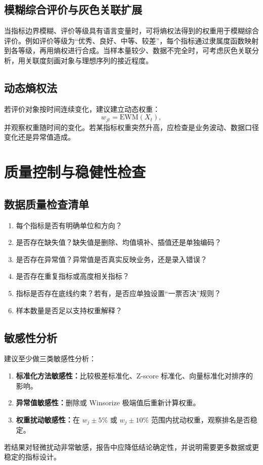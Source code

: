 \documentclass[UTF8,zihao=-4]{ctexart}
\begin{document}
\subsection{模糊综合评价与灰色关联扩展}
当指标边界模糊、评价等级具有语言变量时，可将熵权法得到的权重用于模糊综合评价。例如评价等级为“优秀、良好、中等、较差”，每个指标通过隶属度函数映射到各等级，再用熵权进行合成。当样本量较少、数据不完全时，可考虑灰色关联分析，用关联度刻画对象与理想序列的接近程度。

\subsection{动态熵权法}
若评价对象按时间连续变化，建议建立动态权重：
\begin{equation}
w_{jt}=\text{EWM}(X_t),
\end{equation}
并观察权重随时间的变化。若某指标权重突然升高，应检查是业务波动、数据口径变化还是异常值造成。

\section{质量控制与稳健性检查}

\subsection{数据质量检查清单}
\begin{enumerate}
  \item 每个指标是否有明确单位和方向？
  \item 是否存在缺失值？缺失值是删除、均值填补、插值还是单独编码？
  \item 是否存在异常值？异常值是否真实反映业务，还是录入错误？
  \item 是否存在重复指标或高度相关指标？
  \item 指标是否存在底线约束？若有，是否应单独设置“一票否决”规则？
  \item 样本数量是否足以支持权重解释？
\end{enumerate}

\subsection{敏感性分析}
建议至少做三类敏感性分析：
\begin{enumerate}
  \item \textbf{标准化方法敏感性：}比较极差标准化、Z-score 标准化、向量标准化对排序的影响。
  \item \textbf{异常值敏感性：}删除或 Winsorize 极端值后重新计算权重。
  \item \textbf{权重扰动敏感性：}在 $w_j\pm 5\%$ 或 $w_j\pm 10\%$ 范围内扰动权重，观察排名是否稳定。
\end{enumerate}
若结果对轻微扰动非常敏感，报告中应降低结论确定性，并说明需要更多数据或更稳定的指标设计。
\end{document}
